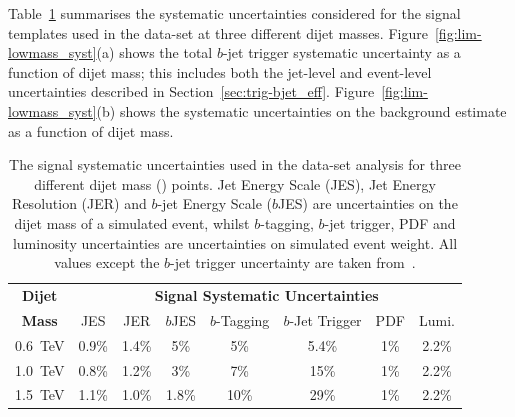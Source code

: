 Table~\ref{tab:lim-lowmass_syst} summarises the systematic uncertainties considered for the
signal templates used in the \lm{} data-set at three different dijet masses.
Figure~\ref{fig:lim-lowmass_syst}(a) shows the total $b$-jet trigger systematic uncertainty as a function of dijet  mass;
this includes both the jet-level and event-level uncertainties described in Section~\ref{sec:trig-bjet_eff}.
Figure~\ref{fig:lim-lowmass_syst}(b) shows the systematic uncertainties on the background estimate as a function of dijet  mass.

\begin{table}[!htb]
  \centering
  \begin{tabular}{|c||c|c|c|c|c|c|c|}
    \hline
    \textbf{Dijet}   & \multicolumn{7}{c|}{\textbf{Signal Systematic Uncertainties}}                    \\ \cline{2-8} 
    \textbf{Mass}    & JES   & JER   & $b$JES  & $b$-Tagging & $b$-Jet Trigger & PDF & Lumi.        \\
    \hline                                                                        
    0.6~TeV          & 0.9\% & 1.4\% & 5\%     &     5\%     &      5.4\%   & 1\% & 2.2\%       \\
    1.0~TeV          & 0.8\% & 1.2\% & 3\%     &     7\%     &       15\%   & 1\% & 2.2\%       \\
    1.5~TeV          & 1.1\% & 1.0\% & 1.8\%    &    10\%     &       29\%   & 1\% & 2.2\%       \\
    \hline
  \end{tabular}
  \caption[The signal systematic uncertainties used in the \lm{} data-set analysis.]
          {The signal systematic uncertainties used in the \lm{} data-set analysis
           for three different dijet mass (\mjj{}) points.
          Jet Energy Scale (JES), Jet Energy Resolution (JER) and $b$-jet Energy Scale ($b$JES)
          are uncertainties on the dijet mass of a simulated event,
          whilst $b$-tagging, $b$-jet trigger, PDF and luminosity uncertainties are uncertainties on simulated event weight.
          All values except the $b$-jet trigger uncertainty are taken from~\cite{dibjet-full_int}.}
  \label{tab:lim-lowmass_syst}
  \end{table}

